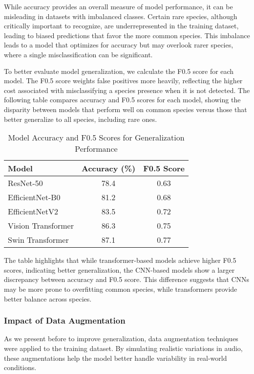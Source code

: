 While accuracy provides an overall measure of model performance, it can be misleading in datasets with imbalanced classes. Certain rare species, although critically important to recognize, are underrepresented in the training dataset, leading to biased predictions that favor the more common species. This imbalance leads to a model that optimizes for accuracy but may overlook rarer species, where a single misclassification can be significant.

To better evaluate model generalization, we calculate the F0.5 score for each model. The F0.5 score weights false positives more heavily, reflecting the higher cost associated with misclassifying a species presence when it is not detected. The following table compares accuracy and F0.5 scores for each model, showing the disparity between models that perform well on common species versus those that better generalize to all species, including rare ones.
\begin{table}[h] 
\begin{tabular}{|l|c|c|} 
\hline
\textbf{Model} & \textbf{Accuracy (\%)} & \textbf{F0.5 Score} \\
\hline 
ResNet-50 & 78.4 & 0.63 \\
EfficientNet-B0 & 81.2 & 0.68 \\
EfficientNetV2 & 83.5 & 0.72 \\
Vision Transformer & 86.3 & 0.75 \\
Swin Transformer & 87.1 & 0.77 \\
\hline 
\end{tabular}
\caption{Model Accuracy and F0.5 Scores for Generalization Performance}
\label{tab:f1_score}
\end{table}

The table highlights that while transformer-based models achieve higher F0.5 scores, indicating better generalization, the CNN-based models show a larger discrepancy between accuracy and F0.5 score. This difference suggests that CNNs may be more prone to overfitting common species, while transformers provide better balance across species.

\subsubsection{Impact of Data Augmentation}

As we present before to improve generalization, data augmentation techniques were applied to the training dataset. By simulating realistic variations in audio, these augmentations help the model better handle variability in real-world conditions.

